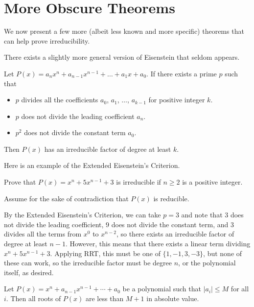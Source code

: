 \documentclass[11pt]{scrartcl}
\begin{document}
\section{More Obscure Theorems}

We now present a few more (albeit less known and more specific) theorems that can help prove irreducibility.

There exists a slightly more general version of Eisenstein that seldom appears.

\begin{theorem*}
Let $P(x) = a_n x^n + a_{n-1} x^{n-1} + \dots + a_1 x + a_0$. If there exists a prime $p$ such that
\begin{itemize}
\item $p$ divides all the coefficients $a_0$, $a_1$, $\dots$, $a_{k-1}$ for positive integer $k$.
\item $p$ does not divide the leading coefficient $a_n$.
\item $p^2$ does not divide the constant term $a_0$.
\end{itemize}
Then $P(x)$ has an irreducible factor of degree at least $k$.
\end{theorem*}

Here is an example of the Extended Eisenstein's Criterion.

\begin{example*}[IMO 1993/1]
Prove that $P(x) = x^n + 5x^{n-1}+3$ is irreducible if $n \ge 2$ is a positive integer.
\end{example*}

Assume for the sake of contradiction that $P(x)$ is reducible.

By the Extended Eisenstein's Criterion, we can take $p = 3$ and note that $3$ does not divide the leading coefficient, $9$ does not divide the constant term, and $3$ divides all the terms from $x^0$ to $x^{n-2}$, so there exists an irreducible factor of degree at least $n-1$. However, this means that there exists a linear term dividing $x^n+5x^{n-1}+3$. Applying RRT, this must be one of $\{1, -1, 3, -3\}$, but none of these can work, so the irreducible factor must be degree $n$, or the polynomial itself, as desired.

\begin{lemma*}
Let $P(x) = x^n + a_{n-1}x^{n-1}+ \cdots + a_0$ be a polynomial such that $|a_i| \le M$ for all $i$. Then all roots of $P(x)$ are less than $M + 1$ in absolute value.
\end{lemma*}
\end{document}
